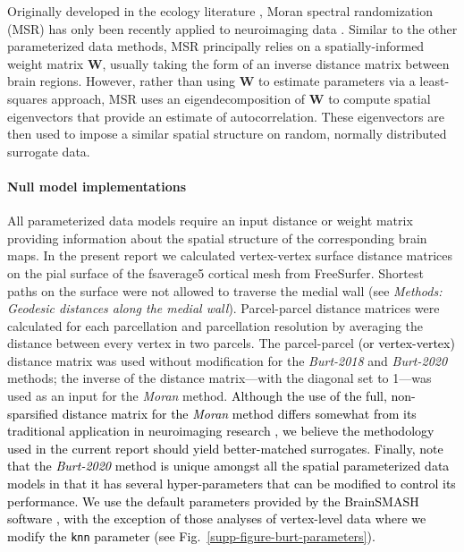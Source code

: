 \documentclass[12pt,aps,pra,reprint,showkeys]{revtex4-1}
\newcommand{\nimg}[1]{\textcolor{black}{{#1}}}
\begin{document}
Originally developed in the ecology literature \citep{dray2011geoanalysis, wagner2015generating}, Moran spectral randomization (MSR) has only been recently applied to neuroimaging data \citep{paquola2020plosbio, vosdewael2020brainspace, royer2020neuroimage}.
Similar to the other parameterized data methods, MSR principally relies on a spatially-informed weight matrix $\mathbf{W}$, usually taking the form of an inverse distance matrix between brain regions.
However, rather than using $\mathbf{W}$ to estimate parameters via a least-squares approach, MSR uses an eigendecomposition of $\mathbf{W}$ to compute spatial eigenvectors that provide an estimate of autocorrelation.
These eigenvectors are then used to impose a similar spatial structure on random, normally distributed surrogate data.

\paragraph*{Null model implementations}

All parameterized data models require an input distance or weight matrix providing information about the spatial structure of the corresponding brain maps.
In the present report we calculated vertex-vertex surface distance matrices on the pial surface of the fsaverage5 cortical mesh from FreeSurfer.
Shortest paths on the surface were not allowed to traverse the medial wall (see \textit{Methods: Geodesic distances along the medial wall}).
Parcel-parcel distance matrices were calculated for each parcellation and parcellation resolution by averaging the distance between every vertex in two parcels.
The parcel-parcel \nimg{(or vertex-vertex)} distance matrix was used without modification for the \textit{Burt-2018} and \textit{Burt-2020} methods; the inverse of the distance matrix---with the diagonal set to 1---was used as an input for the \textit{Moran} method.
\nimg{Although the use of the full, non-sparsified distance matrix for the \textit{Moran} method differs somewhat from its traditional application in neuroimaging research \citep{vosdewael2020brainspace, royer2020neuroimage, paquola2020plosbio}, we believe the methodology used in the current report should yield better-matched surrogates.
Finally, note that the \textit{Burt-2020} method is unique amongst all the spatial parameterized data models in that it has several hyper-parameters that can be modified to control its performance.
We use the default parameters provided by the BrainSMASH software \citep{burt2020neuroimage}, with the exception of those analyses of vertex-level data where we modify the \texttt{knn} parameter (see Fig.~\ref{supp-figure-burt-parameters}).}
\end{document}
